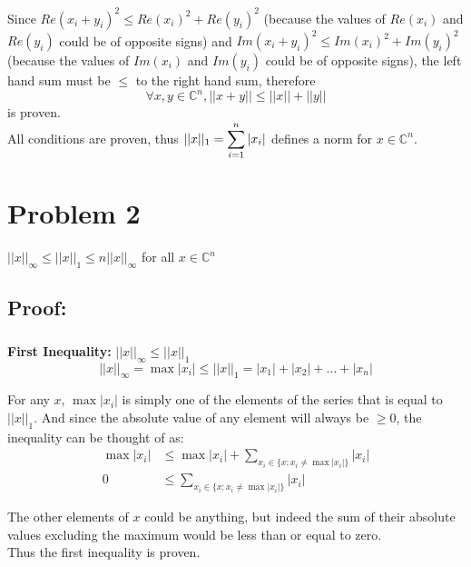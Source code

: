 \documentclass{article}
\begin{document}
Since $Re(x_i+y_i)^2\leq Re(x_i)^2+Re(y_i)^2$ (because the values of $Re(x_i)$ and $Re(y_i)$ could be of opposite signs) and $Im(x_i+y_i)^2\leq Im(x_i)^2+Im(y_i)^2$ (because the values of $Im(x_i)$ and $Im(y_i)$ could be of opposite signs), the left hand sum must be $\leq$ to the right hand sum, therefore
\begin{equation*}
    \forall x, y \in \mathbb{C}^n, ||x+y||\leq||x||+||y||
\end{equation*}
is proven.\\

All conditions are proven, thus $||x||_1=\mathlarger{\sum_{i=1}^n|x_i|}$ defines a norm for $x\in\mathbb{C}^ n$.

 

\pagebreak
\section*{Problem 2}
\centerline{$||x||_\infty\leq||x||_1\leq n||x||_\infty$ for all $x \in \mathbb{C}^n$}
\subsection*{Proof:}
\subsubsection*{}
\textbf{First Inequality: }$||x||_\infty\leq||x||_1$\\
\begin{equation*}
    ||x||_\infty=\max|x_i|\leq||x||_1=|x_1|+|x_2|+\dots+|x_n|
\end{equation*}

For any $x$, $\max|x_i|$ is simply one of the elements of the series that is equal to $||x||_1$.  And since the absolute value of any element will always be $\geq 0$, the inequality can be thought of as:\\
\begin{equation*}
\begin{split}
    \max|x_i|&\leq\max|x_i|+\sum_{x_i\in \{x:x_i\neq\max|x_i|\}}|x_i|\\
    0 &\leq\sum_{x_i\in \{x:x_i\neq\max|x_i|\}}|x_i|
\end{split}
\end{equation*}

The other elements of $x$ could be anything, but indeed the sum of their absolute values excluding the maximum would be less than or equal to zero.\\ Thus the first inequality is proven.
\end{document}
